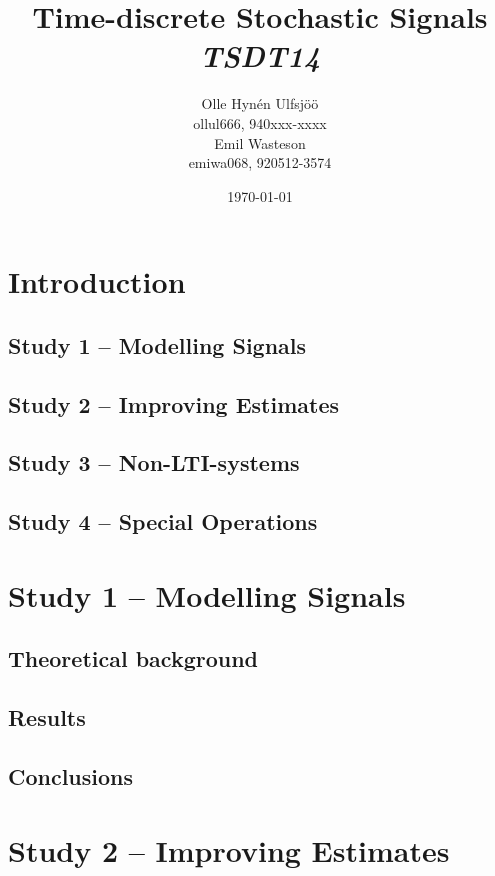 \documentclass[10pt]{article}
\title{Time-discrete Stochastic Signals\\
\emph{TSDT14}}
\author{Olle Hynén Ulfsjöö \\ ollul666, 940xxx-xxxx\\
Emil Wasteson \\ emiwa068, 920512-3574 }
\date{\today}
\begin{document}
\maketitle

\newpage
\tableofcontents
\newpage

\section{Introduction}


\subsection{Study 1 – Modelling Signals}

\subsection{Study 2 – Improving Estimates}

\subsection{Study 3 – Non-LTI-systems}

\subsection{Study 4 – Special Operations}



\section{Study 1 – Modelling Signals}

\subsection{Theoretical background}

\subsection{Results}

\subsection{Conclusions}


\clearpage



\section{Study 2 – Improving Estimates}
\end{document}
